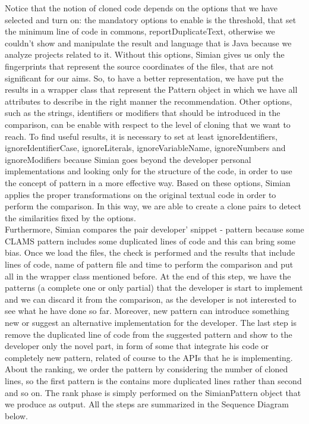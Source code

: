 Notice that the notion of cloned code depends on the options that we have selected and turn on: the mandatory options to enable is the threshold, that set the minimum line of code in commons, reportDuplicateText, otherwise we couldn't show and manipulate the result and language that is Java because we analyze projects related to it. Without this options, Simian gives us only the fingerprints that represent the source coordinates of the files, that are not significant for our aims. So, to have a better representation, we have put the results in a wrapper class that represent the Pattern object in which we have all attributes to describe in the right manner the recommendation. Other options, such as the strings, identifiers or modifiers that should be introduced in the comparison, can be enable with respect to the level of cloning that we want to reach. To find useful results, it is necessary to set at least ignoreIdentifiers, ignoreIdentifierCase, ignoreLiterals, ignoreVariableName, ignoreNumbers and ignoreModifiers because Simian goes beyond the developer personal implementations and looking only for the structure of the code, in order to use the concept of pattern in a more effective way. Based on these options, Simian applies the proper transformations on the original textual code in order to perform the comparison. In this way, we are able to create a clone pairs to detect the similarities fixed by the options. \\
Furthermore, Simian compares the pair developer' snippet - pattern because some CLAMS pattern includes some duplicated lines of code and this can bring some bias. Once we load the files, the check is performed and the results that include lines of code, name of pattern file and time to perform the comparison and put all in the wrapper class mentioned before.
At the end of this step, we have the patterns (a complete one or only partial) that the developer is start to implement and we can discard it from the comparison, as the developer is not interested to see what he have done so far. Moreover, new pattern can introduce something new or suggest an alternative implementation for the developer. The last step is remove the duplicated line of code from the suggested pattern and show to the developer only the novel part, in form of some that integrate his code or completely new pattern, related of course to the APIs that he is implementing. About the ranking, we order the pattern by considering the number of cloned lines, so the first pattern is the contains more duplicated lines rather than second and so on. The rank phase is simply performed on the SimianPattern object that we produce as output. All the steps are summarized in the Sequence Diagram below.

